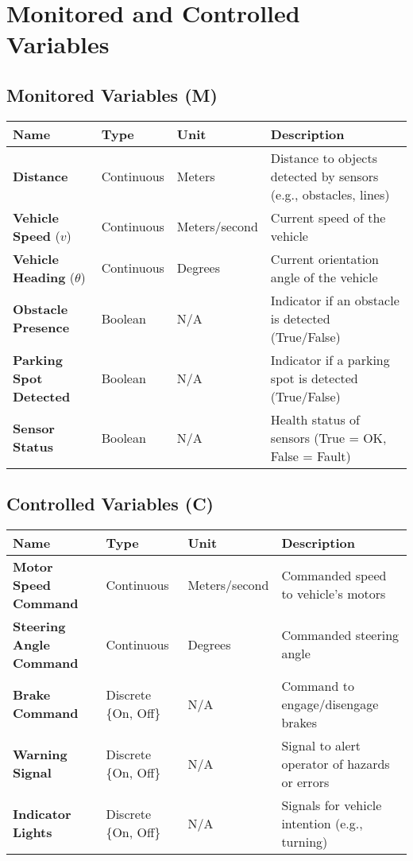 \documentclass[12pt]{article}
\begin{document}
\section{Monitored and Controlled Variables}

\subsection{Monitored Variables (M)}

\small %
\begin{longtable}{p{3.5cm}p{2.5cm}p{2.5cm}p{5cm}}
\toprule
\textbf{Name} & \textbf{Type} & \textbf{Unit} & \textbf{Description} \\
\midrule
\endhead
\textbf{Distance} & Continuous & Meters & Distance to objects detected by sensors (e.g., obstacles, lines) \\
\textbf{Vehicle Speed} ($v$) & Continuous & Meters/second & Current speed of the vehicle \\
\textbf{Vehicle Heading} ($\theta$) & Continuous & Degrees & Current orientation angle of the vehicle \\
\textbf{Obstacle Presence} & Boolean & N/A & Indicator if an obstacle is detected (True/False) \\
\textbf{Parking Spot Detected} & Boolean & N/A & Indicator if a parking spot is detected (True/False) \\
\textbf{Sensor Status} & Boolean & N/A & Health status of sensors (True = OK, False = Fault) \\
\bottomrule
\end{longtable}
\normalsize %

\subsection{Controlled Variables (C)}

\small
\begin{longtable}{p{3.5cm}p{2.5cm}p{2.5cm}p{5cm}}
\toprule
\textbf{Name} & \textbf{Type} & \textbf{Unit} & \textbf{Description} \\
\midrule
\endhead
\textbf{Motor Speed Command} & Continuous & Meters/second & Commanded speed to vehicle's motors \\
\textbf{Steering Angle Command} & Continuous & Degrees & Commanded steering angle \\
\textbf{Brake Command} & Discrete \{On, Off\} & N/A & Command to engage/disengage brakes \\
\textbf{Warning Signal} & Discrete \{On, Off\} & N/A & Signal to alert operator of hazards or errors \\
\textbf{Indicator Lights} & Discrete \{On, Off\} & N/A & Signals for vehicle intention (e.g., turning) \\
\bottomrule
\end{longtable}
\normalsize
\end{document}
